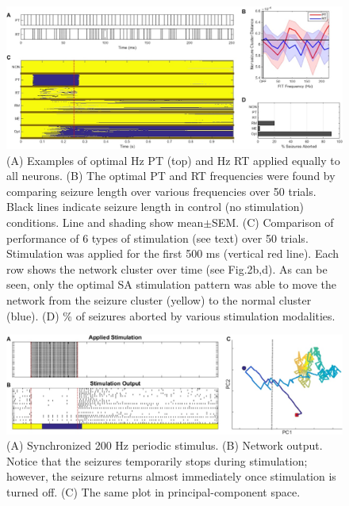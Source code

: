 \documentclass[11pt,a4paper,final]{article}
\begin{document}
\begin{figure}[!ht]
	\centering
	\includegraphics[width=180mm]{MC}
	\caption[Simulated Annealing Monte Carlo Analysis]{
		(A) Examples of optimal \fit{}Hz PT (top) and \rit{}Hz RT applied equally to all \nn{} neurons.
		(B) The optimal PT and RT frequencies were found by comparing seizure length over various frequencies over 50 trials. Black lines indicate seizure length in control (no stimulation) conditions. Line and shading show mean$\pm$SEM.
		(C) Comparison of performance of 6 types of stimulation (see text) over 50 trials. Stimulation was applied for the first 500 ms (vertical red line). Each row shows the network cluster over time (see Fig.2b,d). As can be seen, only the optimal SA stimulation pattern was able to move the network from the seizure cluster (yellow) to the normal cluster (blue).
		(D) \% of seizures aborted by various stimulation modalities.
	}
	\label{MC}
\end{figure}

\begin{figure}[!ht]
	\centering
	\includegraphics[width=180mm]{FITstim}
	\caption[Periodic Stimulation]{
		(A) Synchronized 200 Hz periodic stimulus.
		(B) Network output. Notice that the seizures temporarily stops during stimulation; however, the seizure returns almost immediately once stimulation is turned off.
		(C) The same plot in principal-component space.}
	\label{FITstim}
\end{figure}
\end{document}
